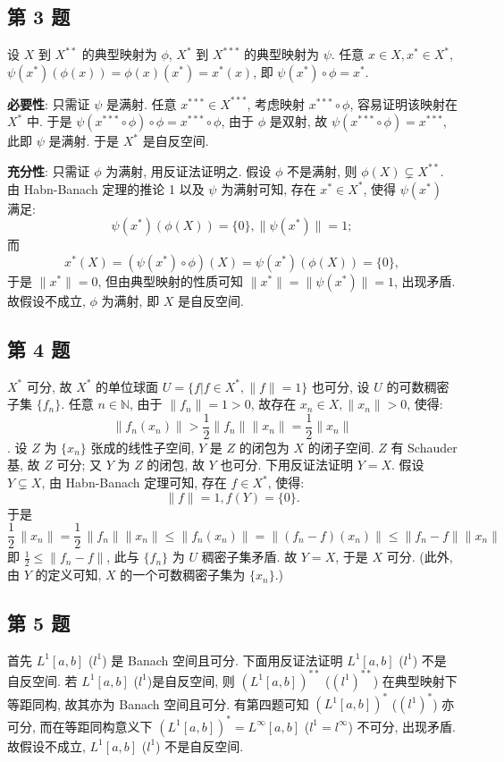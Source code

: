 \documentclass[../main.tex]{subfiles}
\begin{document}
\subsection{第 3 题}
设 $X$ 到 $X^{**}$ 的典型映射为 $\phi$, $X^*$ 到 $X^{***}$ 的典型映射为 $\psi$.
任意 $x \in X, x^* \in X^*$, $\psi (x^*) (\phi (x)) = \phi (x) (x^*) = x^* (x)$,
即 $\psi (x^*) \circ \phi = x^*$.

\noindent \textbf{必要性}:
只需证 $\psi$ 是满射.
任意 $x^{***} \in X^{***}$, 考虑映射 $x^{***} \circ \phi $, 容易证明该映射在 $X^*$ 中.
于是 $\psi (x^{***} \circ \phi) \circ \phi = x^{***} \circ \phi$, 由于 $\phi$ 是双射,
故 $\psi (x^{***} \circ \phi) = x^{***}$, 此即 $\psi$ 是满射.
于是 $X^*$ 是自反空间.

\noindent \textbf{充分性}:
只需证 $\phi$ 为满射, 用反证法证明之.
假设 $\phi$ 不是满射, 则 $\phi (X) \subsetneq X^{**}$.
由 Habn-Banach 定理的推论 1 以及 $\psi$ 为满射可知, 存在 $x^* \in X^*$, 使得 $\psi (x^*)$ 满足:
\[
    \psi (x^*) (\phi (X)) = \{ 0 \} , \| \psi (x^*) \| = 1;
\]
而
\[
    x^* (X) = (\psi (x^*) \circ \phi)(X) = \psi (x^*) (\phi (X)) = \{ 0 \},
\]
于是 $\| x^* \| = 0$, 但由典型映射的性质可知 $\| x^* \| = \| \psi (x^*) \| = 1$, 出现矛盾.
故假设不成立, $\phi$ 为满射, 即 $X$ 是自反空间.

\subsection{第 4 题}
$X^*$ 可分, 故 $X^*$ 的单位球面 $U = \{ f | f \in X^*, \| f \| = 1\}$ 也可分, 设 $U$ 的可数稠密子集 $\{ f_n \}$.
任意 $n \in \mathbb{N}$, 由于 $\| f_n \| = 1 > 0$, 故存在 $x_n \in X, \| x_n \| > 0$, 使得:
\[
    \| f_n (x_n) \| > \frac{1}{2} \| f_n \| \| x_n \| = \frac{1}{2} \| x_n \|
\].
设 $Z$ 为 $\{ x_n \}$ 张成的线性子空间, $Y$ 是 $Z$ 的闭包为 $X$ 的闭子空间.
$Z$ 有 Schauder 基, 故 $Z$ 可分; 又 $Y$ 为 $Z$ 的闭包, 故 $Y$ 也可分.
下用反证法证明 $Y = X$. 
假设 $Y \subsetneq X$, 由 Habn-Banach 定理可知, 存在 $f \in X^*$, 使得:
\[
    \| f \| = 1, f(Y) = \{ 0 \}.
\]
于是
\[
    \frac{1}{2} \, \| x_n \| = \frac{1}{2} \, \| f_n \| \| x_n \| \leqslant \| f_n (x_n) \| = \| (f_n - f) (x_n) \| \leqslant \| f_n - f \| \| x_n \|
\]
即 $\frac{1}{2} \leqslant \| f_n - f \|$, 此与 $\{ f_n \}$ 为 $U$ 稠密子集矛盾. 故 $Y = X$, 于是 $X$ 可分.
(此外, 由 $Y$ 的定义可知, $X$ 的一个可数稠密子集为 $\{ x_n \}$.)

\subsection{第 5 题}
首先 $L^1 [a, b]$ ($l^1$) 是 Banach 空间且可分.
下面用反证法证明 $L^1 [a, b]$ ($l^1$) 不是自反空间.
若 $L^1 [a, b]$ ($l^1$)是自反空间,
则 $(L^1 [a, b])^{**}$ ($(l^1)^{**}$) 在典型映射下等距同构,
故其亦为 Banach 空间且可分.
有第四题可知 $(L^1 [a, b])^{*}$ ($(l^1)^{*}$) 亦可分,
而在等距同构意义下 $(L^1 [a, b])^{*} = L^{\infty} [a, b]$ ($l^1 = l^{\infty}$) 不可分, 出现矛盾.
故假设不成立, $L^1 [a, b]$ ($l^1$) 不是自反空间.
\end{document}
